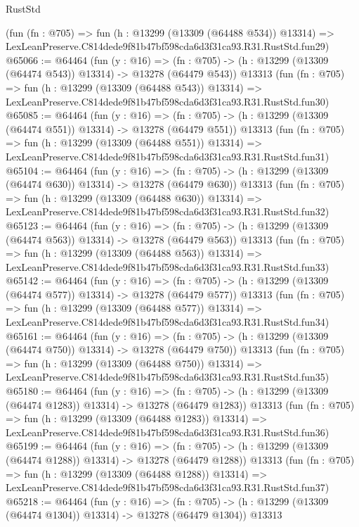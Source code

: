 \begin{lexlean}{RustStd}
\begin{coremodule}
    (fun (fn : @705) =>
    fun (h : @13299 (@13309 (@64488 @534)) @13314) =>
    LexLeanPreserve.C814dede9f81b47bf598cda6d3f31ca93.R31.RustStd.fun29)
@65066 := @64464
    (fun (y : @16) =>
    (fn : @705) -> (h : @13299 (@13309 (@64474 @543)) @13314) -> @13278 (@64479 @543))
    @13313
    (fun (fn : @705) =>
    fun (h : @13299 (@13309 (@64488 @543)) @13314) =>
    LexLeanPreserve.C814dede9f81b47bf598cda6d3f31ca93.R31.RustStd.fun30)
@65085 := @64464
    (fun (y : @16) =>
    (fn : @705) -> (h : @13299 (@13309 (@64474 @551)) @13314) -> @13278 (@64479 @551))
    @13313
    (fun (fn : @705) =>
    fun (h : @13299 (@13309 (@64488 @551)) @13314) =>
    LexLeanPreserve.C814dede9f81b47bf598cda6d3f31ca93.R31.RustStd.fun31)
@65104 := @64464
    (fun (y : @16) =>
    (fn : @705) -> (h : @13299 (@13309 (@64474 @630)) @13314) -> @13278 (@64479 @630))
    @13313
    (fun (fn : @705) =>
    fun (h : @13299 (@13309 (@64488 @630)) @13314) =>
    LexLeanPreserve.C814dede9f81b47bf598cda6d3f31ca93.R31.RustStd.fun32)
@65123 := @64464
    (fun (y : @16) =>
    (fn : @705) -> (h : @13299 (@13309 (@64474 @563)) @13314) -> @13278 (@64479 @563))
    @13313
    (fun (fn : @705) =>
    fun (h : @13299 (@13309 (@64488 @563)) @13314) =>
    LexLeanPreserve.C814dede9f81b47bf598cda6d3f31ca93.R31.RustStd.fun33)
@65142 := @64464
    (fun (y : @16) =>
    (fn : @705) -> (h : @13299 (@13309 (@64474 @577)) @13314) -> @13278 (@64479 @577))
    @13313
    (fun (fn : @705) =>
    fun (h : @13299 (@13309 (@64488 @577)) @13314) =>
    LexLeanPreserve.C814dede9f81b47bf598cda6d3f31ca93.R31.RustStd.fun34)
@65161 := @64464
    (fun (y : @16) =>
    (fn : @705) -> (h : @13299 (@13309 (@64474 @750)) @13314) -> @13278 (@64479 @750))
    @13313
    (fun (fn : @705) =>
    fun (h : @13299 (@13309 (@64488 @750)) @13314) =>
    LexLeanPreserve.C814dede9f81b47bf598cda6d3f31ca93.R31.RustStd.fun35)
@65180 := @64464
    (fun (y : @16) =>
    (fn : @705) -> (h : @13299 (@13309 (@64474 @1283)) @13314) -> @13278 (@64479 @1283))
    @13313
    (fun (fn : @705) =>
    fun (h : @13299 (@13309 (@64488 @1283)) @13314) =>
    LexLeanPreserve.C814dede9f81b47bf598cda6d3f31ca93.R31.RustStd.fun36)
@65199 := @64464
    (fun (y : @16) =>
    (fn : @705) -> (h : @13299 (@13309 (@64474 @1288)) @13314) -> @13278 (@64479 @1288))
    @13313
    (fun (fn : @705) =>
    fun (h : @13299 (@13309 (@64488 @1288)) @13314) =>
    LexLeanPreserve.C814dede9f81b47bf598cda6d3f31ca93.R31.RustStd.fun37)
@65218 := @64464
    (fun (y : @16) =>
    (fn : @705) -> (h : @13299 (@13309 (@64474 @1304)) @13314) -> @13278 (@64479 @1304))
    @13313

\end{coremodule}
\end{lexlean}
